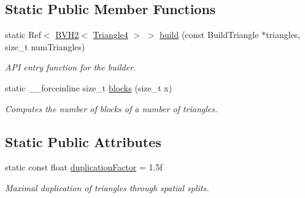 \subsection*{Static Public Member Functions}
\begin{DoxyCompactItemize}
\item 
\hypertarget{classembree_1_1_b_v_h2_builder_spatial_a560f6c1a5e52add82d7887aada313eb4}{
static Ref$<$ \hyperlink{classembree_1_1_b_v_h2}{BVH2}$<$ \hyperlink{structembree_1_1_triangle4}{Triangle4} $>$ $>$ \hyperlink{classembree_1_1_b_v_h2_builder_spatial_a560f6c1a5e52add82d7887aada313eb4}{build} (const BuildTriangle $\ast$triangles, size\_\-t numTriangles)}
\label{classembree_1_1_b_v_h2_builder_spatial_a560f6c1a5e52add82d7887aada313eb4}

\begin{DoxyCompactList}\small\item\em API entry function for the builder. \item\end{DoxyCompactList}\item 
static \_\-\_\-forceinline size\_\-t \hyperlink{classembree_1_1_b_v_h2_builder_spatial_a4a626cb46cdadb3cec1c339a913d8104}{blocks} (size\_\-t x)
\begin{DoxyCompactList}\small\item\em Computes the number of blocks of a number of triangles. \item\end{DoxyCompactList}\end{DoxyCompactItemize}
\subsection*{Static Public Attributes}
\begin{DoxyCompactItemize}
\item 
static const float \hyperlink{classembree_1_1_b_v_h2_builder_spatial_a5772bb5554d960c1ac26cad6274598ac}{duplicationFactor} = 1.5f
\begin{DoxyCompactList}\small\item\em Maximal duplication of triangles through spatial splits. \item\end{DoxyCompactList}\end{DoxyCompactItemize}


